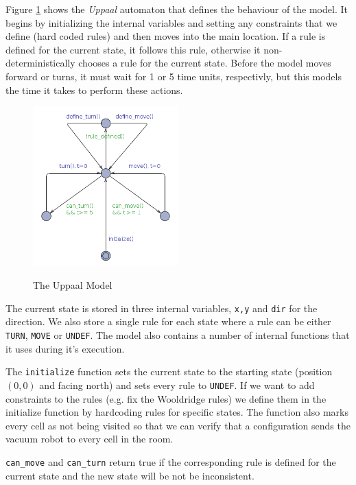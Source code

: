 \documentclass{article}
\begin{document}
		Figure \ref{fig:model} shows the \textit{Uppaal} automaton that defines the behaviour of the model. It begins by initializing the internal variables and setting any constraints that we define (hard coded rules) and then moves into the main location. If a rule is defined for the current state, it follows this rule, otherwise it non-deterministically chooses a rule for the current state. Before the model moves forward or turns, it must wait for 1 or 5 time units, respectivly, but this models the time it takes to perform these actions.

    \begin{figure}[h!]
        \caption{The Uppaal Model}
        \centering
        \includegraphics[width=0.5\textwidth]{model.png}
        \label{fig:model}
    \end{figure}

    The current state is stored in three internal variables, \texttt{x,y} and \texttt{dir} for the direction. We also store a single rule for each state where a rule can be either \texttt{TURN}, \texttt{MOVE} or \texttt{UNDEF}. The model also contains a number of internal functions that it uses during it's execution.
    
    The \texttt{initialize} function sets the current state to the starting state (position $(0,0)$ and facing north) and sets every rule to \texttt{UNDEF}. If we want to add constraints to the rules (e.g. fix the  Wooldridge rules) we define them in the initialize function by hardcoding rules for specific states. The function also marks every cell as not being visited so that we can verify that a configuration sends the vacuum robot to every cell in the room.

    \texttt{can\_move} and \texttt{can\_turn} return true if the corresponding rule is defined for the current state  and the new state will be not be inconsistent.
\end{document}
